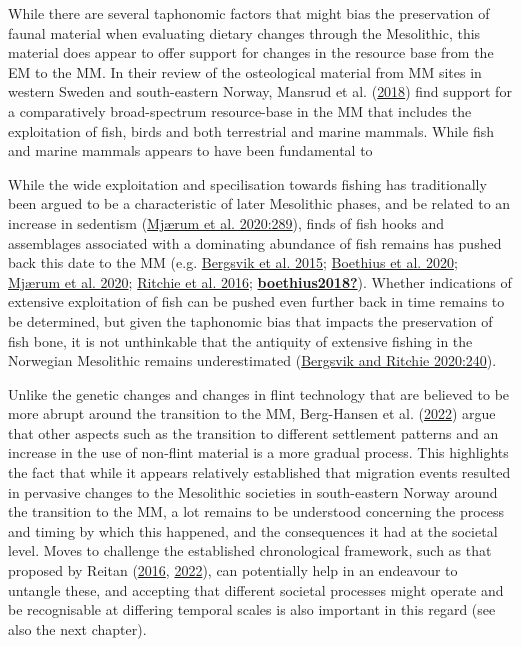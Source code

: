 \documentclass[
  a4paper,
  oneside]{uiophdthesis}
\begin{document}
While there are several taphonomic factors that might bias the preservation of faunal material when evaluating dietary changes through the Mesolithic, this material does appear to offer support for changes in the resource base from the EM to the MM. In their review of the osteological material from MM sites in western Sweden and south-eastern Norway, Mansrud et al. (\protect\hyperlink{ref-mansrud2018}{2018}) find support for a comparatively broad-spectrum resource-base in the MM that includes the exploitation of fish, birds and both terrestrial and marine mammals. While fish and marine mammals appears to have been fundamental to

While the wide exploitation and specilisation towards fishing has traditionally been argued to be a characteristic of later Mesolithic phases, and be related to an increase in sedentism (\protect\hyperlink{ref-mjuxe6rum2020}{Mjærum et al. 2020:289}), finds of fish hooks and assemblages associated with a dominating abundance of fish remains has pushed back this date to the MM (e.g. \protect\hyperlink{ref-bergsvik2015}{Bergsvik et al. 2015}; \protect\hyperlink{ref-boethius2020}{Boethius et al. 2020}; \protect\hyperlink{ref-mjuxe6rum2020}{Mjærum et al. 2020}; \protect\hyperlink{ref-ritchie2016}{Ritchie et al. 2016}; \protect\hyperlink{ref-boethius2018}{\textbf{boethius2018?}}). Whether indications of extensive exploitation of fish can be pushed even further back in time remains to be determined, but given the taphonomic bias that impacts the preservation of fish bone, it is not unthinkable that the antiquity of extensive fishing in the Norwegian Mesolithic remains underestimated (\protect\hyperlink{ref-bergsvik2020b}{Bergsvik and Ritchie 2020:240}).

Unlike the genetic changes and changes in flint technology that are believed to be more abrupt around the transition to the MM, Berg-Hansen et al. (\protect\hyperlink{ref-berg-hansen2022}{2022}) argue that other aspects such as the transition to different settlement patterns and an increase in the use of non-flint material is a more gradual process. This highlights the fact that while it appears relatively established that migration events resulted in pervasive changes to the Mesolithic societies in south-eastern Norway around the transition to the MM, a lot remains to be understood concerning the process and timing by which this happened, and the consequences it had at the societal level. Moves to challenge the established chronological framework, such as that proposed by Reitan (\protect\hyperlink{ref-reitan2016}{2016}, \protect\hyperlink{ref-reitan2022}{2022}), can potentially help in an endeavour to untangle these, and accepting that different societal processes might operate and be recognisable at differing temporal scales is also important in this regard (see also the next chapter).
\end{document}
